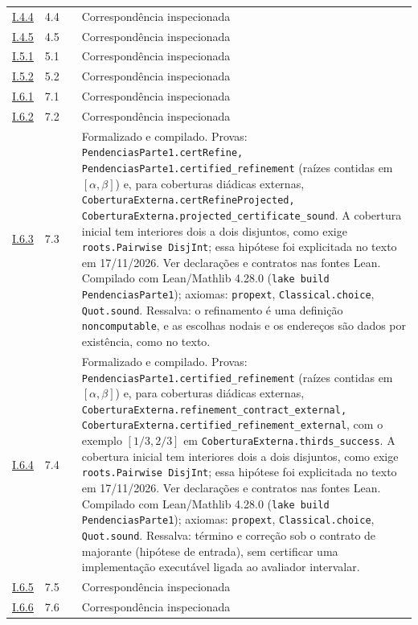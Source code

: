 \documentclass[12pt,a4paper]{article}
\theoremstyle{preciso}
\theoremstyle{definition}
\newcommand{\code}[1]{\nolinkurl{#1}}
\theoremstyle{preciso}
\theoremstyle{preciso}
\theoremstyle{preciso}
\theoremstyle{preciso}
\theoremstyle{definition}
\theoremstyle{preciso}
\theoremstyle{definition}
\theoremstyle{preciso}
\theoremstyle{preciso}
\theoremstyle{definition}
\begin{document}
\begin{singlespace}
\begin{longtable}{@{}p{.11\linewidth}p{.09\linewidth}p{.09\linewidth}p{.59\linewidth}@{}}
\hyperref[map:artigo_1:4.4]{I.4.4} & 4.4 & \pageref{map:artigo_1:4.4} & Correspondência inspecionada\\[4pt]
\hyperref[map:artigo_1:4.5]{I.4.5} & 4.5 & \pageref{map:artigo_1:4.5} & Correspondência inspecionada\\[4pt]
\hyperref[map:artigo_1:5.1]{I.5.1} & 5.1 & \pageref{map:artigo_1:5.1} & Correspondência inspecionada\\[4pt]
\hyperref[map:artigo_1:5.2]{I.5.2} & 5.2 & \pageref{map:artigo_1:5.2} & Correspondência inspecionada\\[4pt]
\hyperref[map:artigo_1:6.1]{I.6.1} & 7.1 & \pageref{map:artigo_1:6.1} & Correspondência inspecionada\\[4pt]
\hyperref[map:artigo_1:6.2]{I.6.2} & 7.2 & \pageref{map:artigo_1:6.2} & Correspondência inspecionada\\[4pt]
\hyperref[map:artigo_1:6.3]{I.6.3} & 7.3 & \pageref{map:artigo_1:6.3} & Formalizado e compilado. Provas: \code{PendenciasParte1.certRefine, PendenciasParte1.certified_refinement} (raízes contidas em $[\alpha,\beta]$) e, para coberturas diádicas externas, \code{CoberturaExterna.certRefineProjected, CoberturaExterna.projected_certificate_sound}. A cobertura inicial tem interiores dois a dois disjuntos, como exige \code{roots.Pairwise DisjInt}; essa hipótese foi explicitada no texto em 17/11/2026. Ver declarações e contratos nas fontes Lean. Compilado com Lean/Mathlib 4.28.0 (\texttt{lake build PendenciasParte1}); axiomas: \texttt{propext}, \texttt{Classical.choice}, \texttt{Quot.sound}. Ressalva: o refinamento é uma definição \texttt{noncomputable}, e as escolhas nodais e os endereços são dados por existência, como no texto.\\[4pt]
\hyperref[map:artigo_1:6.4]{I.6.4} & 7.4 & \pageref{map:artigo_1:6.4} & Formalizado e compilado. Provas: \code{PendenciasParte1.certified_refinement} (raízes contidas em $[\alpha,\beta]$) e, para coberturas diádicas externas, \code{CoberturaExterna.refinement_contract_external, CoberturaExterna.certified_refinement_external}, com o exemplo $[1/3,2/3]$ em \code{CoberturaExterna.thirds_success}. A cobertura inicial tem interiores dois a dois disjuntos, como exige \code{roots.Pairwise DisjInt}; essa hipótese foi explicitada no texto em 17/11/2026. Ver declarações e contratos nas fontes Lean. Compilado com Lean/Mathlib 4.28.0 (\texttt{lake build PendenciasParte1}); axiomas: \texttt{propext}, \texttt{Classical.choice}, \texttt{Quot.sound}. Ressalva: término e correção sob o contrato de majorante (hipótese de entrada), sem certificar uma implementação executável ligada ao avaliador intervalar.\\[4pt]
\hyperref[map:artigo_1:6.5]{I.6.5} & 7.5 & \pageref{map:artigo_1:6.5} & Correspondência inspecionada\\[4pt]
\hyperref[map:artigo_1:6.6]{I.6.6} & 7.6 & \pageref{map:artigo_1:6.6} & Correspondência inspecionada\\[4pt]
\bottomrule\end{longtable}\normalsize


\end{singlespace}
\end{document}
